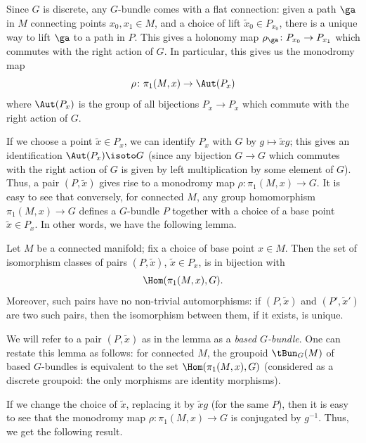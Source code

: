 Since $G$ is discrete, any $G$-bundle comes with a flat connection: given a
path $\ga$ in $M$ connecting points $x_0, x_1\in M$, and a choice of lift
$\tilde x_0\in P_{x_0}$, there is a unique way to lift $\ga$ to a path in $P$.
This gives a holonomy map $\rho_\ga \colon P_{x_0} \to P_{x_1}$ which commutes
with the right action of $G$. In particular, this gives us the monodromy map
\begin{equation}\label{e:monodromy}
  \rho \colon \pi_1(M,x)\to \Aut(P_x)
\end{equation}
where $\Aut(P_x)$ is the group of all bijections $P_x\to P_x$ which commute with
the right action of $G$.

If we choose a point $\tilde x\in P_x$, we can identify $P_x$ with $G$ by
$g\mapsto \tilde x g$; this gives an identification $\Aut(P_x)\isoto G$
(since any bijection $G\to G$ which commutes with the right action of $G$
is given by left multiplication by some element of $G$). Thus, a pair $(P,
\tilde x)$ gives rise to a monodromy map $\rho \colon \pi_1(M,x)\to G$. It
is easy to see that conversely, for connected $M$, any group homomorphism
$\pi_1(M,x)\to G$ defines a $G$-bundle $P$ together with a choice of a base
point $\tilde x \in P_x$. In other words, we have the following lemma.

\begin{lemma}\label{l:monodromy1}
  Let $M$ be a connected manifold; fix a choice of base point $x\in M$.
  Then the set of isomorphism classes of pairs $(P, \tilde x)$,
  $\tilde x\in P_x$, is in bijection with
  $$
  \Hom(\pi_1(M,x),G).
  $$
  Moreover, such pairs have no non-trivial automorphisms: if $(P, \tilde x)$
  and $(P', \tilde x')$ are two such pairs, then the isomorphism between them,
  if it exists, is unique.
\end{lemma}

We will refer to a pair $(P, \tilde x)$ as in the lemma as a
\emph{based $G$-bundle}. One can restate
this lemma as follows: for connected $M$, the groupoid $\tBun_G(M)$
of based $G$-bundles is equivalent to the set
$\Hom(\pi_1(M,x), G)$ (considered as a discrete groupoid: the only morphisms
are identity morphisms).

If we change the choice of $\tilde x$, replacing it by $\tilde x g$ (for the
same $P$), then it is easy to see that the monodromy map
$\rho\colon \pi_1(M,x)\to G$ is conjugated by $g^{-1}$. Thus, we get the
following result.

